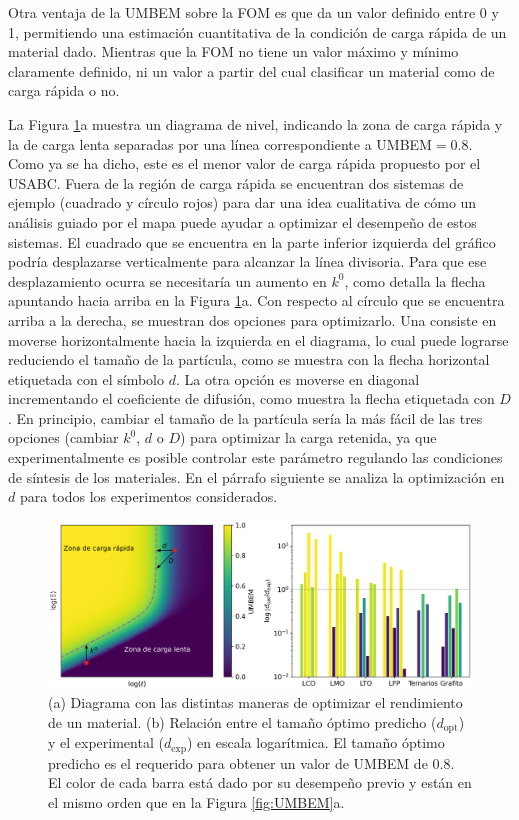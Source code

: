 Otra ventaja de la UMBEM sobre la FOM es que da un valor definido entre 0 y 1,
permitiendo una estimación cuantitativa de la condición de carga rápida de un
material dado. Mientras que la FOM no tiene un valor máximo y mínimo claramente
definido, ni un valor a partir del cual clasificar un material como de carga 
rápida o no.

La Figura \ref{fig:sizes}a muestra un diagrama de nivel, indicando la zona de 
carga rápida y la de carga lenta separadas por una línea correspondiente a
UMBEM$ = 0.8$. Como ya se ha dicho, este es el menor valor de carga rápida 
propuesto por el USABC. Fuera de la región de carga rápida se encuentran dos 
sistemas de ejemplo (cuadrado y círculo rojos) para dar una idea cualitativa de 
cómo un análisis guiado por el mapa puede ayudar a optimizar el desempeño de 
estos sistemas. El cuadrado que se encuentra en la parte inferior izquierda del gráfico 
podría desplazarse verticalmente para alcanzar la línea divisoria. Para que 
ese desplazamiento ocurra se necesitaría un aumento en $k^0$, como detalla la 
flecha apuntando hacia arriba en la Figura \ref{fig:sizes}a. Con respecto al 
círculo que se encuentra arriba a la derecha, se muestran dos opciones para
optimizarlo. Una consiste en moverse horizontalmente hacia la izquierda en el 
diagrama, lo cual puede lograrse reduciendo el tamaño de la partícula, como 
se muestra con la flecha horizontal etiquetada con el símbolo $d$. La otra opción
es moverse en diagonal incrementando el coeficiente de difusión, como 
muestra la flecha etiquetada con $D$. En principio, cambiar el tamaño de la 
partícula sería la más fácil de las tres opciones (cambiar $k^0$, $d$ o $D$) para 
optimizar la carga retenida, ya que experimentalmente es posible controlar este 
parámetro regulando las condiciones de síntesis de los materiales. En el párrafo
siguiente se analiza la optimización en $d$ para todos los experimentos 
considerados.

\begin{figure}[h!]
    \centering
    \includegraphics[width=\textwidth]{FastCharging/umbem/sizes.png}
    \caption{(a) Diagrama con las distintas maneras de optimizar el rendimiento 
    de un material. (b) Relación entre el tamaño óptimo predicho 
    ($d_{\text{opt}}$) y el experimental ($d_{\text{exp}}$) en escala logarítmica.
    El tamaño óptimo predicho es el requerido para obtener un valor de UMBEM 
    de 0.8. El color de cada barra está dado por su desempeño previo y están en 
    el mismo orden que en la Figura \ref{fig:UMBEM}a.}
    \label{fig:sizes}
\end{figure}

